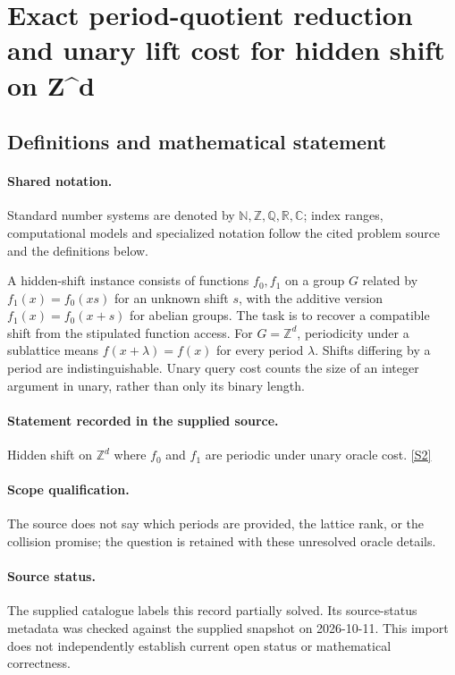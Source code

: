 \documentclass[11pt]{article}
\newcommand{\sref}[2]{\hyperlink{source:#1:#2}{[S#2]}}
\begin{document}
\section{Exact period-quotient reduction and unary lift cost for hidden shift on Z\textasciicircum{}d}\label{statement}

\subsection{Definitions and mathematical statement}

\paragraph{Shared notation.}Standard number systems are denoted by $\mathbb N,\mathbb Z,\mathbb Q,\mathbb R,\mathbb C$; index ranges, computational models and specialized notation follow the cited problem source and the definitions below.


A hidden-shift instance consists of functions $f_0,f_1$ on a group $G$ related by $f_1(x)=f_0(xs)$ for an unknown shift $s$, with the additive version $f_1(x)=f_0(x+s)$ for abelian groups. The task is to recover a compatible shift from the stipulated function access. For $G=\mathbb Z^d$, periodicity under a sublattice means $f(x+\lambda)=f(x)$ for every period $\lambda$. Shifts differing by a period are indistinguishable. Unary query cost counts the size of an integer argument in unary, rather than only its binary length.
\paragraph{Statement recorded in the supplied source.}
Hidden shift on $\mathbb Z^d$ where $f_0$ and $f_1$ are periodic under unary oracle cost. \sref{statement}{2}
\paragraph{Scope qualification.}
The source does not say which periods are provided, the lattice rank, or the collision promise; the question is retained with these unresolved oracle details.
\paragraph{Source status.}
The supplied catalogue labels this record partially solved. Its source-status metadata was checked against the supplied snapshot on 2026-10-11. This import does not independently establish current open status or mathematical correctness.
\end{document}
